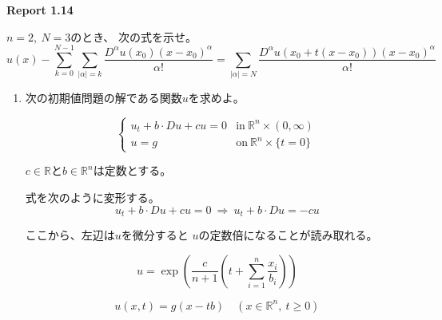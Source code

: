 \documentclass[12pt,b5paper]{ltjsarticle}
\begin{document}
\textbf{Report 1.14}

$n=2,\ N=3$のとき、
次の式を示せ。
\begin{equation}
 u(x) - \sum_{k=0}^{N-1}\sum_{\lvert \alpha \rvert =k}
  \frac{D^{\alpha}u(x_{0})(x-x_{0})^{\alpha}}{\alpha !}
  =\sum_{\lvert \alpha \rvert =N}
  \frac{D^{\alpha}u(x_{0}+t(x-x_{0}))(x-x_{0})^{\alpha}}{\alpha !}
\end{equation}


\dotfill

\hrulefill


\newpage


\hrulefill

\begin{enumerate}
 \item


      次の初期値問題の解である関数$u$を求めよ。

      \begin{equation}
       \begin{cases}
        u_{t} +b\cdot Du + cu =0 & \text{in}\: \mathbb{R}^n \times (0,\infty)\\
        u=g & \text{on}\: \mathbb{R}^n \times \{t=0\}
       \end{cases}
      \end{equation}

      $c\in\mathbb{R}$と$b\in\mathbb{R}^{n}$は定数とする。

      \dotfill


      式を次のように変形する。
      \begin{equation}
       u_{t} +b\cdot Du + cu =0
        \: \Rightarrow \:
        u_{t} +b\cdot Du = - cu
      \end{equation}

      ここから、左辺は$u$を微分すると
      $u$の定数倍になることが読み取れる。

      \begin{equation}
       u
        =\exp\left(
                \frac{c}{n+1}\left( t + \sum_{i=1}^{n}\frac{x_{i}}{b_{i}} \right)
              \right)
      \end{equation}
      


      \begin{equation}
       u(x,t) = g(x-tb) \quad (x\in\mathbb{R}^{n},\: t\geq 0)
      \end{equation}

      \hrulefill



\end{enumerate}
\end{document}
